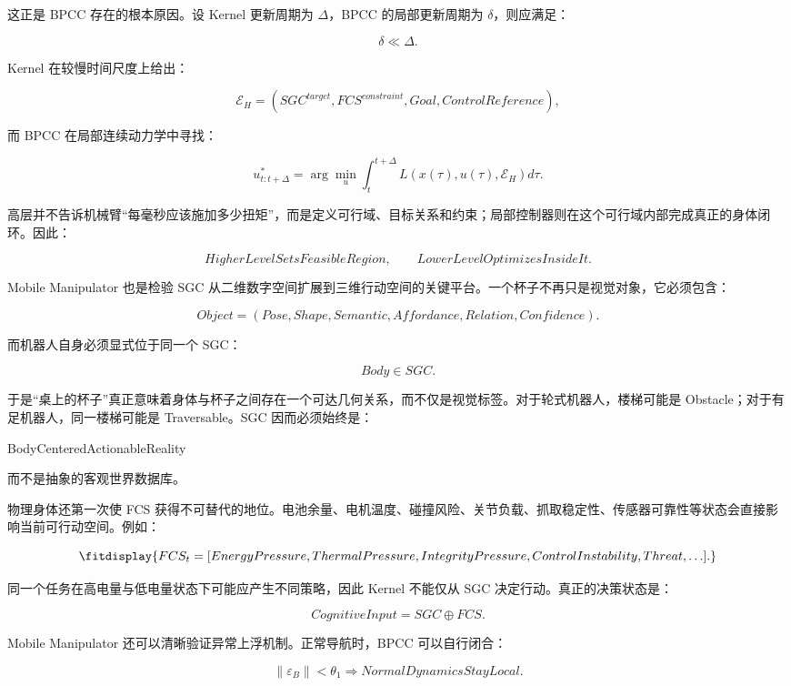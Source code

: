这正是 BPCC 存在的根本原因。设 Kernel 更新周期为 $\Delta$，BPCC 的局部更新周期为 $\delta$，则应满足：

$$
\delta\ll\Delta.
$$

Kernel 在较慢时间尺度上给出：

$$
\mathcal E_H
=
(
SGC^{target},
FCS^{constraint},
Goal,
ControlReference
),
$$

而 BPCC 在局部连续动力学中寻找：

$$
u_{t:t+\Delta}^{*}
=
\arg\min_{u}
\int_t^{t+\Delta}
L(x(\tau),u(\tau),\mathcal E_H)d\tau.
$$

高层并不告诉机械臂“每毫秒应该施加多少扭矩”，而是定义可行域、目标关系和约束；局部控制器则在这个可行域内部完成真正的身体闭环。因此：

$$
\boxed{
HigherLevelSetsFeasibleRegion,\qquad
LowerLevelOptimizesInsideIt.
}
$$

Mobile Manipulator 也是检验 SGC 从二维数字空间扩展到三维行动空间的关键平台。一个杯子不再只是视觉对象，它必须包含：

$$
Object=
(
Pose,
Shape,
Semantic,
Affordance,
Relation,
Confidence
).
$$

而机器人自身必须显式位于同一个 SGC：

$$
Body\in SGC.
$$

于是“桌上的杯子”真正意味着身体与杯子之间存在一个可达几何关系，而不仅是视觉标签。对于轮式机器人，楼梯可能是 Obstacle；对于有足机器人，同一楼梯可能是 Traversable。SGC 因而必须始终是：

\begin{statementbox}
BodyCenteredActionableReality
\end{statementbox}

而不是抽象的客观世界数据库。

物理身体还第一次使 FCS 获得不可替代的地位。电池余量、电机温度、碰撞风险、关节负载、抓取稳定性、传感器可靠性等状态会直接影响当前可行动空间。例如：

$$
\fitdisplay{
FCS_t
=
[
EnergyPressure,
ThermalPressure,
IntegrityPressure,
ControlInstability,
Threat,\ldots
].
}
$$

同一个任务在高电量与低电量状态下可能应产生不同策略，因此 Kernel 不能仅从 SGC 决定行动。真正的决策状态是：

$$
\boxed{
CognitiveInput
=
SGC\oplus FCS.
}
$$

Mobile Manipulator 还可以清晰验证异常上浮机制。正常导航时，BPCC 可以自行闭合：

$$
\|\varepsilon_B\|<\theta_1
\Rightarrow
NormalDynamicsStayLocal.
$$


